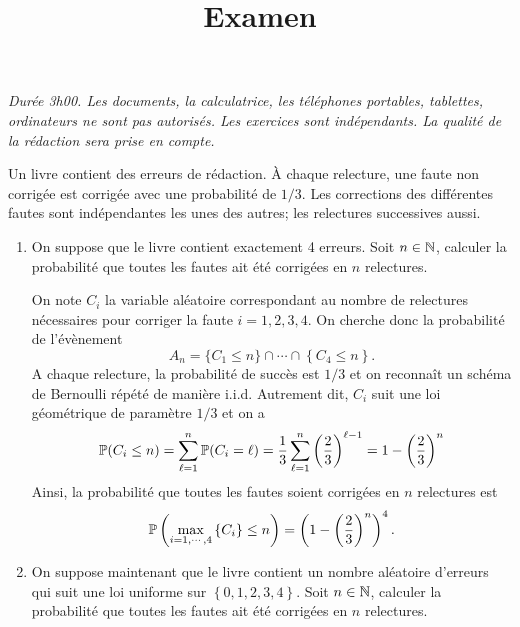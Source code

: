 \documentclass[a4paper]{tp_um}
\title{\large \sffamily\bfseries Examen}
\begin{document}
\maketitle
\textit{Durée 3h00. Les documents, la calculatrice, les téléphones portables, tablettes, ordinateurs ne sont pas autorisés. Les exercices sont indépendants. La qualité de la rédaction sera prise en compte.} 

\bigskip
\bigskip

\exo{}
Un livre contient des erreurs de rédaction. À chaque relecture, une faute non corrigée est corrigée avec une probabilité de $1/3$. Les corrections des différentes fautes sont indépendantes les unes des autres; les relectures successives aussi.
\begin{enumerate}
    \item On suppose que le livre contient exactement 4 erreurs. Soit $n\in\N$, calculer la probabilité que toutes les fautes ait été corrigées en $n$ relectures. %

        \medskip

    On note $C_i$ la variable aléatoire correspondant au nombre de relectures nécessaires pour corriger la faute $i=1,2,3,4$. On cherche donc la probabilité de l'évènement 
    \[
    A_n  = \{C_1 \leq n\} \cap \cdots \cap \left\{ C_4 \leq n \right\}.
    \]
    A chaque relecture, la probabilité de succès est $1/3$ et on reconnaît un schéma de Bernoulli répété de manière i.i.d. Autrement dit, $C_i$ suit une loi géométrique de paramètre $1/3$ et on  a 
        \[
            \P(C_i \leq n) = \sum_{\ell=1}^n \P(C_i =\ell) = \frac 13 \sum_{\ell=1}^n \left( \frac 23 \right)^{\ell-1} = 1 - \left( \frac 23 \right)^n
    \]
    Ainsi, la probabilité que toutes les fautes soient corrigées en $n$ relectures est 
    \begin{equation}\label{eq.1}
        \P\left( \max_{i=1,\cdots,4} \left\{ C_i \right\} \leq n \right) = \left(1 - \left( \frac 23 \right)^n \right)^4.
    \end{equation}

        \medskip
    
\item On suppose maintenant que le livre contient un nombre aléatoire d'erreurs qui suit une loi uniforme sur $\left\{ 0,1,2,3,4 \right\}$. Soit $n\in\N$, calculer la probabilité que toutes les fautes ait été corrigées en $n$ relectures.%


\end{enumerate}
\end{document}
